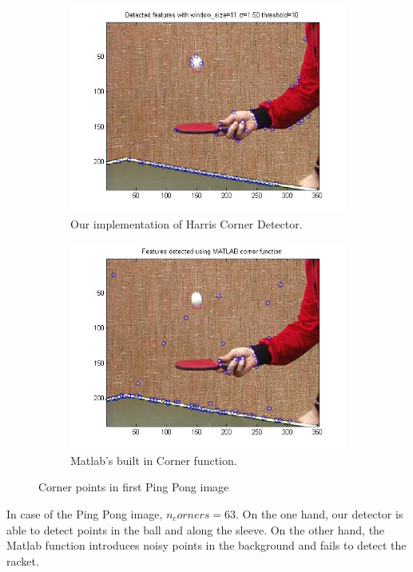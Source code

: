 \documentclass[11pt]{article}
\begin{document}
\begin{figure}[H] \centering
	\begin{subfigure}{.5\textwidth} \centering
		\includegraphics[width=.9\textwidth]{imgs/ourCorners_pingpong.jpg}
		\caption{Our implementation of Harris Corner Detector.}
		\label{fig:ourCorners_pingpong}
	\end{subfigure}%
	\begin{subfigure}{.5\textwidth}	\centering
		\includegraphics[width=.9\textwidth]{imgs/matlabCorners_pingpong.jpg}
		\caption{Matlab's built in Corner function.}
		\label{fig:matlabCorners_pingpong}
	\end{subfigure}
	\caption{Corner points in first Ping Pong image}
	\label{fig:corners_pingpong}
\end{figure}

In case of the Ping Pong image, $n_corners = 63$. On the one hand, our detector is able to detect points in the ball and along the sleeve. On the other hand, the Matlab function introduces noisy points in the background and fails to detect the racket. 
\end{document}
